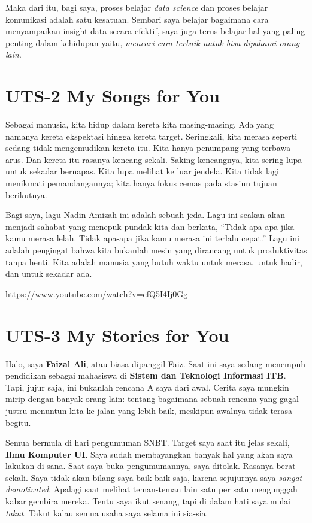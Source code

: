 \documentclass[
  letterpaper,
  DIV=11,
  numbers=noendperiod]{scrreprt}
\begin{document}
Maka dari itu, bagi saya, proses belajar \emph{data science} dan proses
belajar komunikasi adalah satu kesatuan. Sembari saya belajar bagaimana
cara menyampaikan insight data secara efektif, saya juga terus belajar
hal yang paling penting dalam kehidupan yaitu, \emph{mencari cara
terbaik untuk bisa dipahami orang lain}.


\chapter{UTS-2 My Songs for You}\label{uts-2-my-songs-for-you}

Sebagai manusia, kita hidup dalam kereta kita masing-masing. Ada yang
namanya kereta ekspektasi hingga kereta target. Seringkali, kita merasa
seperti sedang tidak mengemudikan kereta itu. Kita hanya penumpang yang
terbawa arus. Dan kereta itu rasanya kencang sekali. Saking kencangnya,
kita sering lupa untuk sekadar bernapas. Kita lupa melihat ke luar
jendela. Kita tidak lagi menikmati pemandangannya; kita hanya fokus
cemas pada stasiun tujuan berikutnya.

Bagi saya, lagu Nadin Amizah ini adalah sebuah jeda. Lagu ini
seakan-akan menjadi sahabat yang menepuk pundak kita dan berkata,
``Tidak apa-apa jika kamu merasa lelah. Tidak apa-apa jika kamu merasa
ini terlalu cepat.'' Lagu ini adalah pengingat bahwa kita bukanlah mesin
yang dirancang untuk produktivitas tanpa henti. Kita adalah manusia yang
butuh waktu untuk merasa, untuk hadir, dan untuk sekadar ada.

\url{https://www.youtube.com/watch?v=efQ5I4Ij0Gg}


\chapter{UTS-3 My Stories for You}\label{uts-3-my-stories-for-you}

Halo, saya \textbf{Faizal Ali}, atau biasa dipanggil Faiz. Saat ini saya
sedang menempuh pendidikan sebagai mahasiswa di \textbf{Sistem dan
Teknologi Informasi ITB}. Tapi, jujur saja, ini bukanlah rencana A saya
dari awal. Cerita saya mungkin mirip dengan banyak orang lain: tentang
bagaimana sebuah rencana yang gagal justru menuntun kita ke jalan yang
lebih baik, meskipun awalnya tidak terasa begitu.

Semua bermula di hari pengumuman SNBT. Target saya saat itu jelas
sekali, \textbf{Ilmu Komputer UI}. Saya sudah membayangkan banyak hal
yang akan saya lakukan di sana. Saat saya buka pengumumannya, saya
ditolak. Rasanya berat sekali. Saya tidak akan bilang saya baik-baik
saja, karena sejujurnya saya \emph{sangat demotivated}. Apalagi saat
melihat teman-teman lain satu per satu mengunggah kabar gembira mereka.
Tentu saya ikut senang, tapi di dalam hati saya mulai \emph{takut}.
Takut kalau semua usaha saya selama ini sia-sia.
\end{document}
